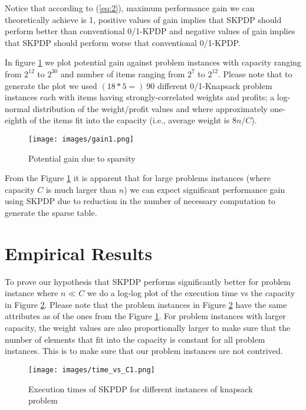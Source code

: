 Notice that according to (\ref{eq:2}), maximum performance gain we can
theoretically achieve is 1, positive values of gain implies that SKPDP should
perform better than conventional 0/1-KPDP and negative values of gain implies
that SKPDP should perform worse that conventional 0/1-KPDP.

In figure \ref{fig:gain1} we plot potential gain against problem instances
with capacity ranging from $2^{12}$ to $2^{30}$ and number of items ranging
from $2^7$ to $2^{12}$.  Please note that to generate the plot we used
$(18*5=)\ 90$ different 0/1-Knapsack problem instances each with items having
strongly-correlated weights and profits; a log-normal distribution of the
weight/profit values and where approximately one-eighth of the items fit into
the capacity (i.e., average weight is $8n/C$).

\begin{figure}[htbp]
\centerline{\texttt{[image: images/gain1.png]}}
\caption{Potential gain due to sparsity}
\label{fig:gain1}
\end{figure}

From the Figure \ref{fig:gain1} it is apparent that for large problems
instances (where capacity $C$ is much larger than $n$) we can expect
significant performance gain using SKPDP due to reduction in the number of
necessary computation to generate the sparse table.

\section{Empirical Results}
To prove our hypothesis that SKPDP performs significantly better for problem
instance where $n \ll C$ we do a log-log plot of the execution time vs the
capacity in Figure \ref{fig:time_vs_c1}.  Please note that the problem
instances in Figure \ref{fig:time_vs_c1} have the same attributes as of the
ones from the Figure \ref{fig:gain1}.  For problem instances with larger
capacity, the weight values are also proportionally larger to make sure that
the number of elements that fit into the capacity is constant for all problem
instances.  This is to make sure that our problem instances are not contrived.
 
\begin{figure}[htbp]
\centerline{\texttt{[image: images/time\_vs\_C1.png]}}
\caption{Execution times of SKPDP for different instances of knapsack problem}
\label{fig:time_vs_c1}
\end{figure}


